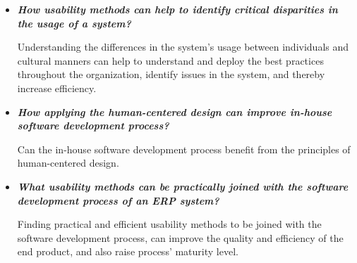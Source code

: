 \documentclass[12pt,a4paper,oneside,pdftex]{report}
\begin{document}
\begin{itemize}
\item \textbf{\emph{How usability methods can help to identify critical disparities in the usage of a system?}}

Understanding the differences in the system's usage between individuals and cultural manners can help to understand and deploy the best practices throughout the organization, identify issues in the system, and thereby increase efficiency.

\item \textbf{\emph{How applying the human-centered design can improve in-house software development process?}}

Can the in-house software development process benefit from the principles of human-centered design.

\item \textbf{\emph{What usability methods can be practically joined with the software development process of an ERP system?}}

Finding practical and efficient usability methods to be joined with the software development process, can improve the quality and efficiency of the end product, and also raise process' maturity level.

\end{itemize}




\end{document}
